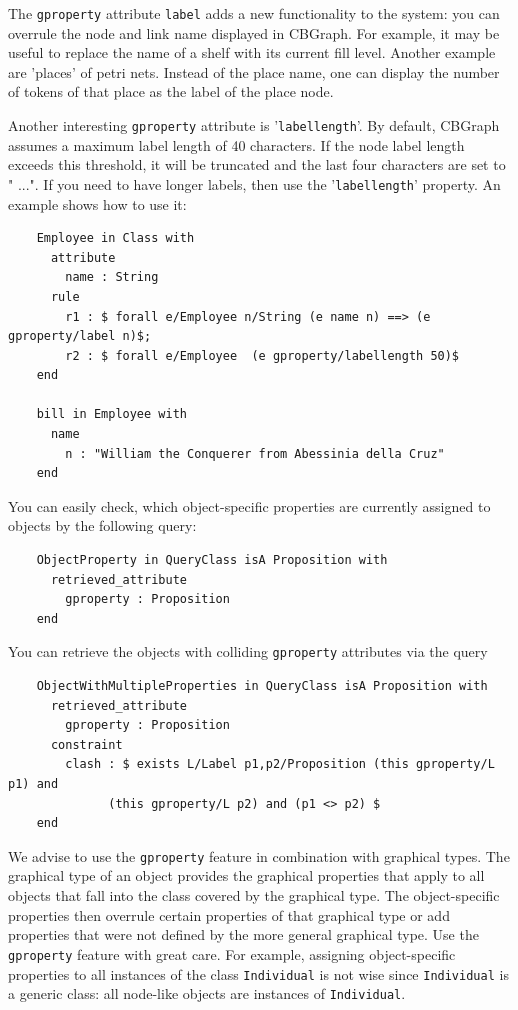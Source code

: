 The {\tt gproperty} attribute {\tt label} adds a new functionality to the system:
you can overrule the node and link name displayed in CBGraph. For example, it may be useful
to replace the name of a shelf with its current fill level. Another example are 'places'
of petri nets. Instead of the place name, one can display the number of tokens of that
place as the label of the place node. 

Another interesting {\tt gproperty} attribute is '{\tt labellength}'. By default, CBGraph
assumes a maximum label length of 40 characters. If the node label length exceeds this
threshold, it will be truncated and the last four characters are set to " ...". If
you need to have longer labels, then use the '{\tt labellength}' property. An example shows
how to use it:

{\small
\begin{verbatim}
    Employee in Class with  
      attribute
        name : String
      rule
        r1 : $ forall e/Employee n/String (e name n) ==> (e gproperty/label n)$;
        r2 : $ forall e/Employee  (e gproperty/labellength 50)$
    end 

    bill in Employee with  
      name
        n : "William the Conquerer from Abessinia della Cruz"
    end
\end{verbatim}
}



You can easily check, which object-specific properties are currently assigned to objects
by the following query:

{\small
\begin{verbatim}
    ObjectProperty in QueryClass isA Proposition with  
      retrieved_attribute
        gproperty : Proposition
    end 
\end{verbatim}
}

You can retrieve the objects with colliding {\tt gproperty} attributes via the query

{\small
\begin{verbatim}
    ObjectWithMultipleProperties in QueryClass isA Proposition with  
      retrieved_attribute
        gproperty : Proposition
      constraint
        clash : $ exists L/Label p1,p2/Proposition (this gproperty/L p1) and
              (this gproperty/L p2) and (p1 <> p2) $
    end 

\end{verbatim}
}

We advise to use the {\tt gproperty} feature in combination with graphical types. The graphical
type of an object provides the graphical properties that apply to all objects that fall into
the class covered by the graphical type. The object-specific properties then overrule certain
properties of that graphical type or add properties that were not defined by the more
general graphical type. Use the {\tt gproperty} feature with great care. For example, assigning
object-specific properties to all instances of the class {\tt Individual} is not wise
since {\tt Individual} is a generic class: all node-like objects are instances of {\tt Individual}.


